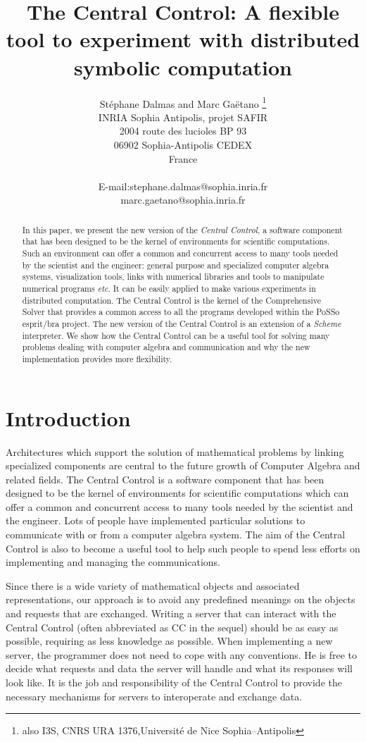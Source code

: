\documentclass {article}
\title{The Central Control: A flexible tool to experiment with distributed
symbolic computation}
\author{
        St\'ephane Dalmas and Marc Ga\"etano
        \thanks{also I3S, CNRS URA 1376,Universit\'e 
                          de Nice Sophia--Antipolis}\\
        {\small INRIA Sophia Antipolis, projet SAFIR} \\
        {\small 2004 route des lucioles }
         {\small BP 93} \\
         {\small 06902 Sophia-Antipolis {\sc CEDEX}} \\
         {\small France } \\
         {\small 
          \begin{tabular} {ll}
            E-mail:& stephane.dalmas@sophia.inria.fr\\
                   & marc.gaetano@sophia.inria.fr
          \end{tabular} 
         }
}
\begin{document}
 

\maketitle

\begin{abstract}
In this paper, we present the new version of the {\em Central Control\/}, 
a software component that has been designed to be the
kernel of  environments for scientific computations. Such an environment
can offer a common
and concurrent access to many tools needed by the scientist and the
engineer: general purpose and specialized computer algebra systems,
visualization tools, links with numerical libraries and tools to manipulate
numerical programs {\sl etc}.
It can be easily applied to make various experiments in distributed
computation.  
The Central Control is the kernel of the Comprehensive Solver that provides
a common access to all the programs developed within 
the PoSSo {\sc esprit/bra} project.
The new version of the Central Control is an extension of a {\sl Scheme}
interpreter.
We show how the Central Control can be a useful tool for solving many
problems dealing with computer algebra and communication and why the new 
implementation provides more flexibility.
\end{abstract} 

\section{ Introduction }

Architectures which support the solution of mathematical problems
by linking specialized components are central to the future growth
of Computer Algebra and related fields.
The Central Control is a software component 
that has been designed to be the kernel of environments for scientific
computations which can offer a common and concurrent access to many tools
needed by the scientist and the engineer. 
Lots of people have implemented particular solutions to communicate with or
from a computer algebra system.
The aim of the Central Control is also to become a useful tool to help such
people to spend less efforts on implementing and managing the communications.

Since there is a wide variety of  mathematical objects and associated
representations, 
our approach is to avoid any predefined meanings on the objects and
requests that are exchanged. 
Writing a server that can interact with the Central Control
(often abbreviated as CC in the sequel)
should be as easy as possible,
requiring as less knowledge as possible. 
When implementing  a new server, the programmer does not need to cope with  
any conventions. 
He is free to decide what requests and data the server will handle and what
its responses will look like. 
It is the job and responsibility of
the Central Control to provide the necessary mechanisms for servers to
interoperate and exchange data.
\end{document}
